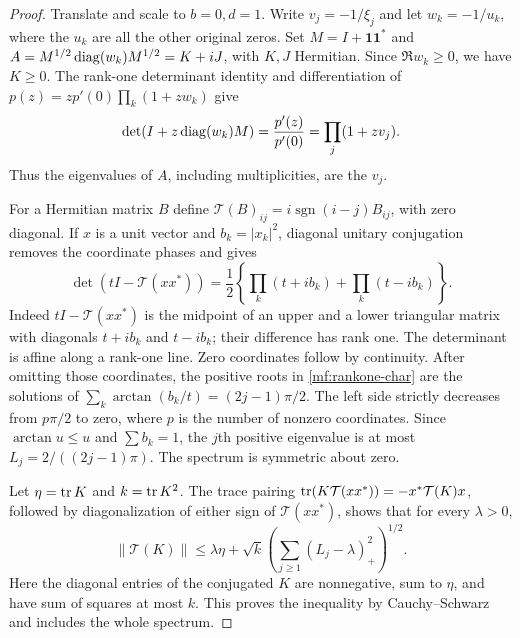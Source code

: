 \begin{proof}
Translate and scale to $b=0,d=1$. Write $v_j=-1/\xi_j$ and let
$w_k=-1/u_k$, where the $u_k$ are all the other original zeros.
Set $M=I+\mathbf1\mathbf1^*$ and
$A=M^{1/2}\operatorname{diag}(w_k)M^{1/2}=K+iJ$, with $K,J$ Hermitian.
Since $\Re w_k\ge0$, we have $K\ge0$. The rank-one determinant
identity and differentiation of $p(z)=zp'(0)\prod_k(1+zw_k)$ give
\[
 \det(I+z\operatorname{diag}(w_k)M)=\frac{p'(z)}{p'(0)}
                    =\prod_j(1+zv_j).
\]
Thus the eigenvalues of $A$, including multiplicities, are the $v_j$.

For a Hermitian matrix $B$ define
$\mathcal T(B)_{ij}=i\operatorname{sgn}(i-j)B_{ij}$, with zero
diagonal. If $x$ is a unit vector and $b_k=|x_k|^2$, diagonal
unitary conjugation removes the coordinate phases and gives
\begin{equation}\label{mf:rankone-char}
 \det(tI-\mathcal T(xx^*))
 =\frac12\left\{\prod_k(t+ib_k)+\prod_k(t-ib_k)\right\}.
\end{equation}
Indeed $tI-\mathcal T(xx^*)$ is the midpoint of an upper and a
lower triangular matrix with diagonals $t+ib_k$ and $t-ib_k$;
their difference has rank one. The determinant is affine along
a rank-one line. Zero coordinates follow by continuity.
After omitting those coordinates, the positive roots in
\eqref{mf:rankone-char} are the solutions of
$\sum_k\arctan(b_k/t)=(2j-1)\pi/2$. The left side strictly
decreases from $p\pi/2$ to zero, where $p$ is the number of
nonzero coordinates. Since $\arctan u\le u$ and $\sum b_k=1$,
the $j$th positive eigenvalue is at most
$L_j=2/((2j-1)\pi)$. The spectrum is symmetric about zero.

Let $\eta=\operatorname{tr} K$ and $k=\operatorname{tr} K^2$. The trace pairing
$\operatorname{tr}(K\mathcal T(xx^*))=-x^*\mathcal T(K)x$, followed by
diagonalization of either sign of $\mathcal T(xx^*)$, shows that
for every $\lambda>0$,
\begin{equation}\label{mf:schur-pair}
 \|\mathcal T(K)\|
 \le\lambda\eta+\sqrt{k}
       \left(\sum_{j\ge1}(L_j-\lambda)_+^2\right)^{1/2}.
\end{equation}
Here the diagonal entries of the conjugated $K$ are nonnegative,
sum to $\eta$, and have sum of squares at most $k$. This proves
the inequality by Cauchy--Schwarz and includes the whole spectrum.


\end{proof}
